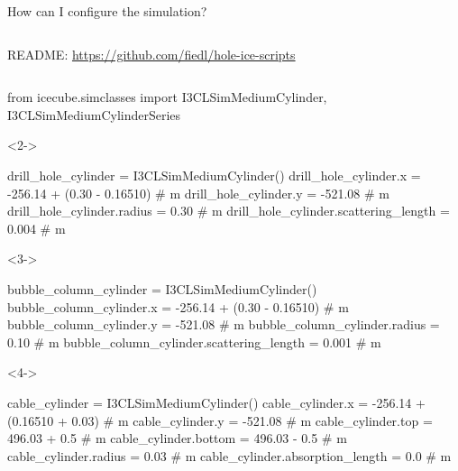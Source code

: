 
\begin{frame}[t,fragile]{How can I configure the simulation?}
  \begin{column}[t]{0.37\textwidth}
    \begin{overlayarea}{\textwidth}{\textheight}
      
      \vspace*{3cm}
      README: \url{https://github.com/fiedl/hole-ice-scripts}
    \end{overlayarea}
  \end{column}
  \begin{column}[t]{0.6\textwidth}
    \vspace*{-14cm}
    \begin{python}
      from icecube.simclasses import I3CLSimMediumCylinder, I3CLSimMediumCylinderSeries
    \end{python}
    \begin{onlyenv}<2->
      \begin{python}
        drill_hole_cylinder = I3CLSimMediumCylinder()
        drill_hole_cylinder.x = -256.14 + (0.30 - 0.16510) # m
        drill_hole_cylinder.y = -521.08 # m
        drill_hole_cylinder.radius = 0.30 # m
        drill_hole_cylinder.scattering_length = 0.004 # m
      \end{python}
    \end{onlyenv}

    \begin{onlyenv}<3->
      \begin{python}
        bubble_column_cylinder = I3CLSimMediumCylinder()
        bubble_column_cylinder.x = -256.14 + (0.30 - 0.16510) # m
        bubble_column_cylinder.y = -521.08 # m
        bubble_column_cylinder.radius = 0.10 # m
        bubble_column_cylinder.scattering_length = 0.001 # m
      \end{python}
    \end{onlyenv}

    \begin{onlyenv}<4->
      \begin{python}
        cable_cylinder = I3CLSimMediumCylinder()
        cable_cylinder.x = -256.14 + (0.16510 + 0.03) # m
        cable_cylinder.y = -521.08 # m
        cable_cylinder.top = 496.03 + 0.5 # m
        cable_cylinder.bottom = 496.03 - 0.5 # m
        cable_cylinder.radius = 0.03 # m
        cable_cylinder.absorption_length = 0.0 # m
      \end{python}
    \end{onlyenv}
    

\end{column}
\end{frame}
